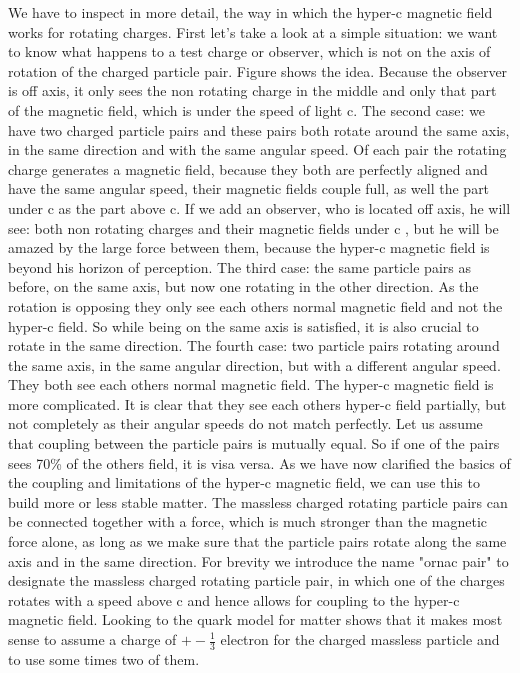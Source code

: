 We have to inspect in more detail, the way in which the hyper-c magnetic field works for rotating charges. First let's take a look at a simple situation: we want to know what happens to a test charge or observer, which is not on the axis of rotation of the charged particle pair. Figure shows the idea. Because the observer is off axis, it only sees the non rotating charge in the middle and only that part of the magnetic field, which is under the speed of light c. The second case: we have two charged particle pairs and these pairs both rotate around the same axis, in the same direction and with the same angular speed. Of each pair the rotating charge generates a magnetic field, because they both are perfectly aligned and have the same angular speed, their magnetic fields couple full, as well the part under c as the part above c. If we add an observer, who is located off axis, he will see: both non rotating charges and their magnetic fields under c , but he will be amazed by the large force between them, because the hyper-c magnetic field is beyond his horizon of perception. The third case: the same particle pairs as before, on the same axis, but now one rotating in the other direction. As the rotation is opposing they only see each others normal magnetic field and not the hyper-c field. So while being on the same axis is satisfied, it is also crucial to rotate in the same direction. The fourth case: two particle pairs rotating around the same axis, in the same angular direction, but with a different angular speed.  They both see each others normal magnetic field. The hyper-c magnetic field is more complicated. It is clear that they see each others hyper-c field partially, but not completely as their angular speeds do not match perfectly. Let us assume that coupling between the particle pairs is mutually equal. So if one of the pairs sees 70\% of the others field, it is visa versa.
As we have now clarified the basics of the coupling and limitations of the hyper-c magnetic field, we can use this to build more or less stable matter. The massless charged rotating particle pairs can be connected together with a force, which is much stronger than the magnetic force alone, as long as we make sure that the particle pairs rotate along the same axis and in the same direction. For brevity we introduce the name "ornac pair" to designate the massless charged rotating particle pair, in which one of the charges rotates with a speed above c and hence allows for coupling to the hyper-c magnetic field. Looking to the quark model for matter shows that it makes most sense to assume a charge of  $+-\frac{1}{3}$ electron for the charged massless particle and to use some times two of them.















